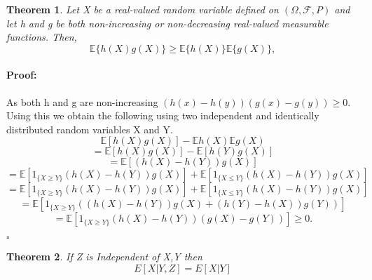 \documentclass{article}
\newenvironment{proof}{\paragraph{Proof:}}{\hfill$\square$}
\newtheorem{theorem}{Theorem}[section]
\begin{document}
\begin{theorem}
 Let  X  be a real-valued random variable defined on  $(\Omega, \mathcal{F}, P)$ 
 and let  h  and  g  be both non-increasing or non-decreasing real-valued measurable functions. Then,
\[
\mathbb{E}\{h(X)g(X)\} \geq \mathbb{E}\{h(X)\}\mathbb{E}\{g(X)\},
\]

\end{theorem}
\begin{proof}
 As both  h  and  g are non-increasing  $(h(x) - h(y))(g(x) - g(y)) \geq 0.$
 Using this we obtain the following using two independent and identically distributed random variables  X  and  Y.
\[
\mathbb{E}[h(X)g(X)] - \mathbb{E}h(X)\mathbb{E}g(X)
\]
\[
= \mathbb{E}[h(X)g(X)] - \mathbb{E}[h(Y)g(X)]
\]
\[
= \mathbb{E}[(h(X) - h(Y))g(X)]
\]
\[
= \mathbb{E}[1_{\{X \geq Y\}}(h(X) - h(Y))g(X)] + \mathbb{E}[1_{\{X \leq Y\}}(h(X) - h(Y))g(X)]
\]
\[
= \mathbb{E}[1_{\{X \geq Y\}}(h(X) - h(Y))g(X)] + \mathbb{E}[1_{\{X \leq Y\}}(h(X) - h(Y))g(X)]
\]
\[
= \mathbb{E}[1_{\{X \geq Y\}}((h(X) - h(Y))g(X) + (h(Y) - h(X))g(Y))]
\]
\[
= \mathbb{E}[1_{\{X \geq Y\}}(h(X) - h(Y))(g(X) - g(Y))] \geq 0.
\]

\end{proof}
\begin{theorem}
    If Z is Independent of X,Y then \[E[X|Y,Z] = E[X|Y]\]
\end{theorem}
\end{document}
